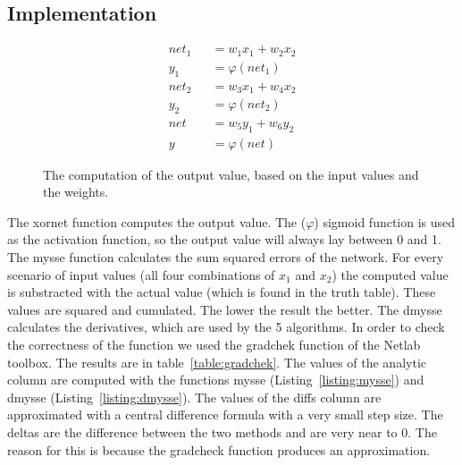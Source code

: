 \documentclass{article}
\begin{document}
\subsection{Implementation}
\begin{figure}[H]
	\centering
	\begin{eqnarray}
		net_1 &&= w_1x_1 + w_2x_2 \\
		y_1 &&= \varphi(net_1) \\
		net_2 &&= w_3x_1 + w_4x_2 \\
		y_2 &&= \varphi(net_2) \\
		net &&= w_5y_1 + w_6y_2\\
		y &&= \varphi(net)
	\end{eqnarray}
	\caption{The computation of the output value, based on the input values and the weights.}
\end{figure}

The xornet function computes the output value. The ($\varphi$) sigmoid function is used as the activation function, so the output value will always lay between 0 and 1. The mysse function calculates the sum squared errors of the network. For every scenario of input values (all four combinations of $x_1$ and $x_2$) the computed value is substracted with the actual value (which is found in the truth table). These values are squared and cumulated. The lower the result the better. The dmysse calculates the derivatives, which are used by the 5 algorithms. In order to check the correctness of the function we used the gradchek function of the Netlab toolbox. The results are in table~\ref{table:gradchek}. The values of the analytic column are computed with the functions mysse (Listing~\ref{listing:mysse}) and dmysse (Listing~\ref{listing:dmysse}). The values of the diffs column are approximated with a central difference formula with a very small step size. The deltas are the difference between the two methods and are very near to 0. The reason for this is because the gradcheck function produces an approximation. 
\end{document}

